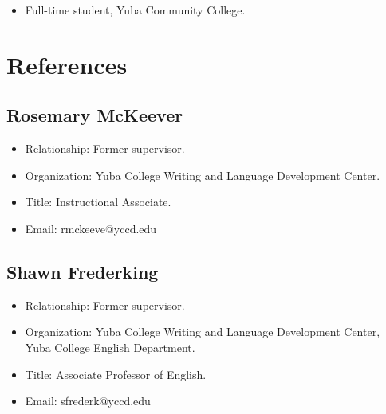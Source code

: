 \documentclass[12pt]{article}
\begin{document}
\begin{itemize}
\item Full-time student, Yuba Community College.
\end{itemize}
\section*{References}
\label{sec-6}
\subsection*{Rosemary McKeever}
\label{sec-6-1}

\begin{itemize}
\item Relationship: Former supervisor.
\item Organization: Yuba College Writing and Language Development Center.
\item Title: Instructional Associate.
\item Email: rmckeeve@yccd.edu
\end{itemize}
\subsection*{Shawn Frederking}
\label{sec-6-2}

\begin{itemize}
\item Relationship: Former supervisor.
\item Organization: Yuba College Writing and Language Development Center,
    Yuba College English Department.
\item Title: Associate Professor of English.
\item Email: sfrederk@yccd.edu
\end{itemize}
\end{document}
